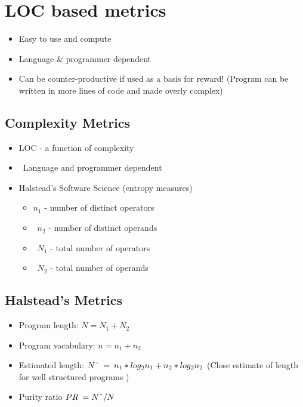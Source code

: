 \documentclass{article}
\begin{document}
\section{LOC based metrics}

\begin{itemize}
  \item Easy	to	use	and compute	
  \item Language \&	programmer	dependent	
  \item Can	be	counter-productive	if	used	as	a	basis	for	reward! (Program can be written in more lines of code and made overly complex)
\end{itemize}

\subsection{Complexity Metrics}

\begin{itemize}
  \item  LOC	-	a	function	of	complexity
  \item  Language	and	programmer	dependent
  \item Halstead’s	Software	Science	(entropy	measures)
  \begin{itemize}
    \item $n_{1}$	-	number	of	distinct	operators
    \item  $n_{2}$	-	number	of	distinct	operands	
    \item  $N_{1}$	-	total	number	of	operators
    \item  $N_{2}$	-	total	number	of	operands
  \end{itemize}
\end{itemize}

\subsection{Halstead’s Metrics}

\begin{itemize}
  \item Program length: $N = N_{1} + N_{2}$
  \item Program vacabulary: $n = n_{1} + n_{2}$
  \item Estimated	length: $N \text{\^{}} \: = \: n_{1} * log_{2}n_{1} + n_{2} * log_{2}n_{2} $ (Close	estimate	of	length	for	well	structured	programs	)
  \item Purity ratio $PR \: = N \text{\^{}} / N$
\end{itemize}
\end{document}
